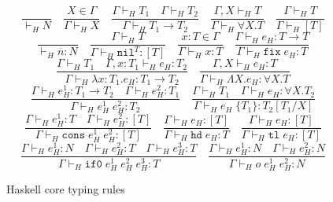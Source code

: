 \begin{figure}[p]
\label{hctr}
\caption{Haskell core typing rules}
\[
\frac{}{\vdash_{H}N}
\quad
\frac{X\in\Gamma}{\Gamma\vdash_{H}X}
\quad
\frac{\Gamma\vdash_{H}T_{1}\quad\Gamma\vdash_{H}T_{2}}{\Gamma\vdash_{H}T_{1}\rightarrow T_{2}}
\quad
\frac{\Gamma ,X\vdash_{H}T}{\Gamma\vdash_{H}\forall X.T}
\quad
\frac{\Gamma\vdash_{H}T}{\Gamma\vdash_{H}[T]}
\]
\bigskip
\[
\frac{}{\vdash_{H}\overline{n}:N}
\quad
\frac{\Gamma\vdash_{H}T}{\Gamma\vdash_{H}\mathtt{nil}^{T}:[T]}
\quad
\frac{x:T\in\Gamma}{\Gamma\vdash_{H}x:T}
\quad
\frac{\Gamma\vdash_{H}e_{H}:T\rightarrow T}{\Gamma\vdash_{H}\mathtt{fix}\;e_{H}:T}
\]
\[
\frac{\Gamma\vdash_{H}T_{1}\quad\Gamma,x:T_{1}\vdash_{H}e_{H}:T_{2}}{\Gamma\vdash_{H}\lambda x:T_{1}.e_{H}:T_{1}\rightarrow T_{2}}
\quad
\frac{\Gamma,X\vdash_{H}e_{H}:T}{\Gamma\vdash_{H}\Lambda X.e_{H}:\forall X.T}
\]
\[
\frac{\Gamma\vdash_{H}e_{H}^{1}:T_{1}\rightarrow T_{2}\quad\Gamma\vdash_{H}e_{H}^{2}:T_{1}}{\Gamma\vdash_{H}e_{H}^{1}\;e_{H}^{2}:T_{2}}
\quad
\frac{\Gamma\vdash_{H}T_{1}\quad\Gamma\vdash_{H}e_{H}:\forall X.T_{2}}{\Gamma\vdash_{H}e_{H}\;\lbrace T_{1}\rbrace:T_{2}[T_{1}/X]}
\]
\[
\frac{\Gamma\vdash_{H}e_{H}^{1}:T\quad\Gamma\vdash_{H}e_{H}^{2}:[T]}{\Gamma\vdash_{H}\mathtt{cons}\;e_{H}^{1}\;e_{H}^{2}:[T]}
\quad
\frac{\Gamma\vdash_{H}e_{H}:[T]}{\Gamma\vdash_{H}\mathtt{hd}\;e_{H}:T}
\quad
\frac{\Gamma\vdash_{H}e_{H}:[T]}{\Gamma\vdash_{H}\mathtt{tl}\;e_{H}:[T]}
\]
\[
\frac{\Gamma\vdash_{H}e_{H}^{1}:N\quad\Gamma\vdash_{H}e_{H}^{2}:T\quad\Gamma\vdash_{H}e_{H}^{3}:T}{\Gamma\vdash_{H}\mathtt{if0}\;e_{H}^{1}\;e_{H}^{2}\;e_{H}^{3}:T}
\quad
\frac{\Gamma\vdash_{H}e_{H}^{1}:N\quad\Gamma\vdash_{H}e_{H}^{2}:N}{\Gamma\vdash_{H}o\;e_{H}^{1}\;e_{H}^{2}:N}
\]
\end{figure}